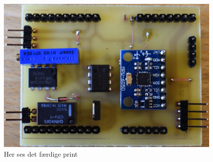 \begin{figure}[h!b]
	\centering
		\includegraphics[scale=0.04]{Billeder/Print-top.JPG}
	\caption{Her ses det færdige print}
	\label{fig:Print}
\end{figure}


